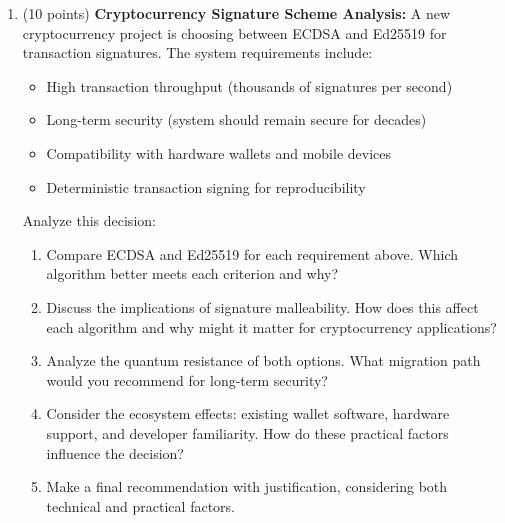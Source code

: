 \documentclass[10pt,a4paper,american]{article}
\begin{document}
\begin{enumerate}
	\item (10 points) \textbf{Cryptocurrency Signature Scheme Analysis:}
	      A new cryptocurrency project is choosing between ECDSA and Ed25519 for transaction signatures. The system requirements include:
	      \begin{itemize}
		      \item High transaction throughput (thousands of signatures per second)
		      \item Long-term security (system should remain secure for decades)
		      \item Compatibility with hardware wallets and mobile devices
		      \item Deterministic transaction signing for reproducibility
	      \end{itemize}
	      Analyze this decision:
	      \begin{enumerate}
		      \item Compare ECDSA and Ed25519 for each requirement above. Which algorithm better meets each criterion and why?
		      \item Discuss the implications of signature malleability. How does this affect each algorithm and why might it matter for cryptocurrency applications?
		      \item Analyze the quantum resistance of both options. What migration path would you recommend for long-term security?
		      \item Consider the ecosystem effects: existing wallet software, hardware support, and developer familiarity. How do these practical factors influence the decision?
		      \item Make a final recommendation with justification, considering both technical and practical factors.
	      \end{enumerate}


\end{enumerate}
\end{document}
